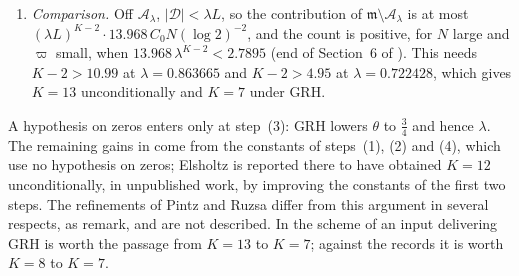 \begin{enumerate}
\item[(5)] \emph{Comparison.} Off $\mathcal A_\lambda$, $|\mathcal D|<\lambda L$, so the contribution of $\mathfrak m\setminus\mathcal A_\lambda$ is at most $(\lambda L)^{K-2}\cdot13.968\,C_0N(\log2)^{-2}$, and the count is positive, for $N$ large and $\varpi$ small, when $13.968\,\lambda^{K-2}<2.7895$ (end of Section~6 of \cite{HBP02}). This needs $K-2>10.99$ at $\lambda=0.863665$ and $K-2>4.95$ at $\lambda=0.722428$, which gives $K=13$ unconditionally and $K=7$ under GRH.
\end{enumerate}
A hypothesis on zeros enters only at step~(3): GRH lowers $\theta$ to $\tfrac34$ and hence $\lambda$. The remaining gains in \cite{HBP02} come from the constants of steps~(1), (2) and (4), which use no hypothesis on zeros; Elsholtz is reported there to have obtained $K=12$ unconditionally, in unpublished work, by improving the constants of the first two steps. The refinements of Pintz and Ruzsa \cite{PR03,PR20} differ from this argument in several respects, as \cite{HBP02} remark, and are not described. In the scheme of \cite{HBP02} an input delivering GRH is worth the passage from $K=13$ to $K=7$; against the records it is worth $K=8$ to $K=7$.

